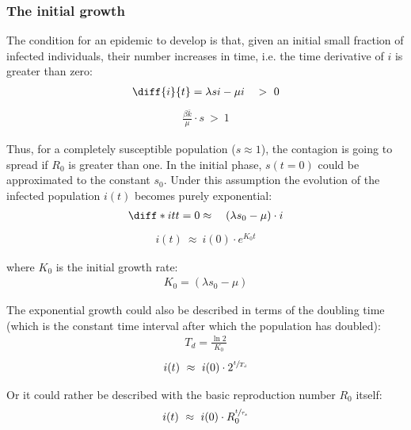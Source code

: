 \documentclass[DIV=12, BCOR=0pt]{scrartcl}  %
\begin{document}
  \subsubsection{The initial growth}
  The condition for an epidemic to develop is that, given an initial small fraction of infected individuals, their number increases in time, i.e. the time derivative of $i$ is greater than zero:
  \begin{align}
  	\diff{i}{t} = \lambda s i - \mu i \quad > \ 0 
  	\label{sir_growthCond}
  \end{align}
  \begin{align} %
  	\frac{\beta \bar{k} }{\mu} \cdot s \ > \ 1  %
  	\label{eq:sir_growthReq}
  \end{align}
  
  Thus, for a completely susceptible population ($s \approx 1$), the contagion is going to spread if $R_0$ is greater than one. In the initial phase, $s( t \! = \! 0)$ could be approximated to the constant $s_0$.
  Under this assumption the evolution of the infected population $i(t)$ becomes purely exponential:
  \begin{align}
  	\diff*{i}{t}{t=0} \approx \quad (\lambda s_0 - \mu) \cdot i 
  	\label{eq:sir_approxi}
  \end{align}
  \begin{align} %
  	i(t) \ \approx \ i(0) \cdot e^{K_0 t} 
  	\label{eq:sir_growthK0}
  \end{align}
  
 where $K_0$ is the initial growth rate:
 \begin{align} %
 	K_0 = (\lambda s_0 - \mu)
 	\label{eq:sir_K0}
 \end{align}
 
 The exponential growth could also be described in terms of the doubling time (which is the constant time interval after which the population has doubled):
	\begin{align}
		T_{d} = \frac{\ln 2}{K_0}
		\label{eq:doubling} 
	\end{align}
	\begin{align}
		i(t) \ \approx \ i(0) \cdot 2^{\sfrac{t}{T_{d}}}
		\label{eq:sir_growthTd} 
	\end{align}

	Or it could rather be described with the basic reproduction number $R_0$ itself:
	\begin{align}
		i(t) \ \approx \ i(0) \cdot R_0^{\sfrac{t}{\tau_s}}
		\label{eq:sir_growthR0}
	\end{align}
\end{document}
